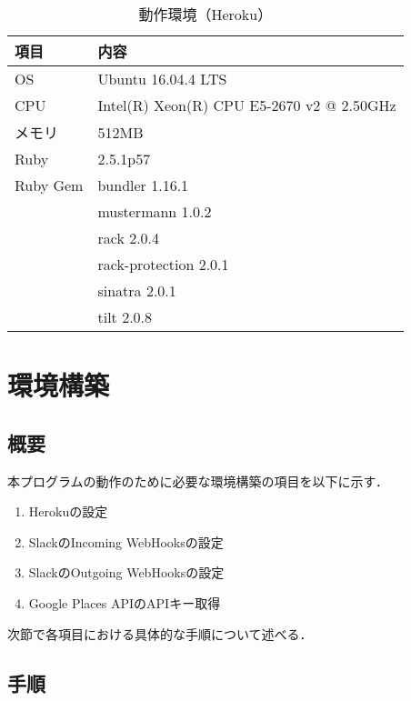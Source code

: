 \documentclass[12pt]{jsarticle}
\begin{document}
\begin{table}[h]
  \begin{center}
    \caption{動作環境（Heroku）}\label{tab:heroku_env}
    \begin{tabular}{l|l}
      \hline \hline
      項目 & 内容 \\ \hline
      OS & Ubuntu 16.04.4 LTS\\ 
      CPU & Intel(R) Xeon(R) CPU E5-2670 v2 @ 2.50GHz\\
      メモリ & 512MB \\
      Ruby & 2.5.1p57 \\
      Ruby Gem & bundler 1.16.1 \\
      & mustermann 1.0.2\\
      & rack 2.0.4 \\
      & rack-protection 2.0.1\\
      & sinatra 2.0.1\\
      & tilt 2.0.8 \\
      \hline
    \end{tabular}
  \end{center}
\end{table}

\newpage
\section{環境構築}
\label{sec:setup}
\subsection{概要}
本プログラムの動作のために必要な環境構築の項目を以下に示す．

\begin{enumerate}
\item Herokuの設定
\item SlackのIncoming WebHooksの設定
\item SlackのOutgoing WebHooksの設定
\item Google Places APIのAPIキー取得
\end{enumerate}
次節で各項目における具体的な手順について述べる．

\subsection{手順}
\end{document}
